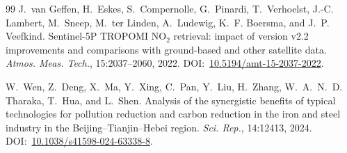 \documentclass[11pt,a4paper]{article}
\providecommand{\doi}[1]{DOI:~\href{https://doi.org/#1}{#1}}
\providecommand{\ce}[1]{\ensuremath{\mathrm{#1}}}
\begin{document}
\begin{thebibliography}{99}
J.~van Geffen, H.~Eskes, S.~Compernolle, G.~Pinardi, T.~Verhoelst, J.-C. Lambert, M.~Sneep,
M.~ter Linden, A.~Ludewig, K.~F. Boersma, and J.~P. Veefkind.
\newblock Sentinel-5P TROPOMI \ce{NO_2} retrieval: impact of version v2.2 improvements and
comparisons with ground-based and other satellite data.
\newblock \emph{Atmos. Meas. Tech.}, 15:2037--2060, 2022.
\newblock \doi{10.5194/amt-15-2037-2022}.

W.~Wen, Z.~Deng, X.~Ma, Y.~Xing, C.~Pan, Y.~Liu, H.~Zhang, W.~A.~N.~D. Tharaka, T.~Hua, and
L.~Shen.
\newblock Analysis of the synergistic benefits of typical technologies for pollution reduction and
carbon reduction in the iron and steel industry in the Beijing--Tianjin--Hebei region.
\newblock \emph{Sci. Rep.}, 14:12413, 2024.
\newblock \doi{10.1038/s41598-024-63338-8}.

\end{thebibliography}
\end{document}
